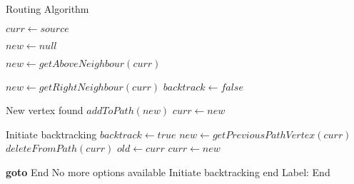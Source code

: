 \documentclass{article}
\begin{document}
\begin{algorithm}
\caption{Routing Algorithm}
\begin{algorithmic}[1]
\State $curr \gets source$
\item[]

 \State $new \gets null$
 \item[]
 
  \State $new \gets getAboveNeighbour(curr)$
 \EndIf
 \item[]
 
  \State $new \gets getRightNeighbour(curr)$
  \State $backtrack \gets false$
 \EndIf
 \item[]
 
 \Comment New vertex found
  \State $addToPath(new)$
  \State $curr \gets new$
  \item[]
  
 \Else \Comment Initiate backtracking
  \State $backtrack \gets true$
   \Repeat
   \State $new \gets getPreviousPathVertex(curr)$
   \State $deleteFromPath(curr)$
   \State $old \gets curr$
   \State $curr \gets new$   
  \EndIf
  \item[]
  
  \State \textbf{goto} End \Comment No more options available
  \EndIf
 \EndIf \Comment Initiate backtracking end
\EndWhile
\EndProcedure \Comment Label: End
\end{algorithmic}
\end{algorithm}
\end{document}
